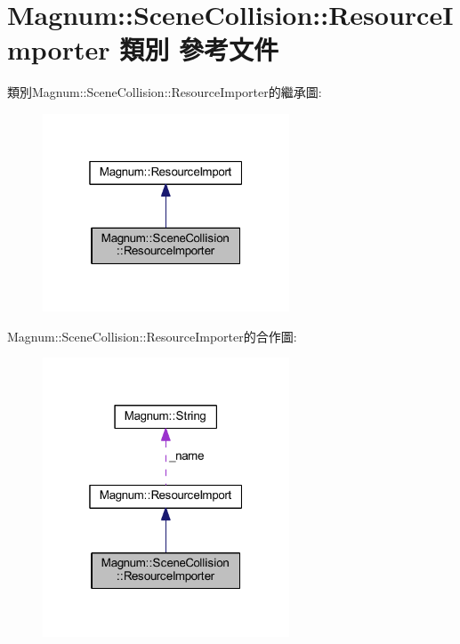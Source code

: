 \hypertarget{class_magnum_1_1_scene_collision_1_1_resource_importer}{}\section{Magnum\+:\+:Scene\+Collision\+:\+:Resource\+Importer 類別 參考文件}
\label{class_magnum_1_1_scene_collision_1_1_resource_importer}


類別\+Magnum\+:\+:Scene\+Collision\+:\+:Resource\+Importer的繼承圖\+:\nopagebreak
\begin{figure}[H]
\begin{center}
\leavevmode
\includegraphics[width=208pt]{class_magnum_1_1_scene_collision_1_1_resource_importer__inherit__graph}
\end{center}
\end{figure}


Magnum\+:\+:Scene\+Collision\+:\+:Resource\+Importer的合作圖\+:\nopagebreak
\begin{figure}[H]
\begin{center}
\leavevmode
\includegraphics[width=208pt]{class_magnum_1_1_scene_collision_1_1_resource_importer__coll__graph}
\end{center}
\end{figure}
